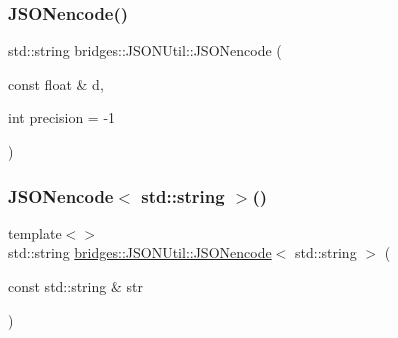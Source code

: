 \subsubsection{\texorpdfstring{J\+S\+O\+Nencode()}{JSONencode()}\hspace{0.1cm}{\footnotesize\ttfamily [4/4]}}
{\footnotesize\ttfamily std\+::string bridges\+::\+J\+S\+O\+N\+Util\+::\+J\+S\+O\+Nencode (\begin{DoxyParamCaption}\item[{const float \&}]{d,  }\item[{int}]{precision = {\ttfamily -\/1} }\end{DoxyParamCaption})\hspace{0.3cm}{\ttfamily [inline]}}

\mbox{\label{namespacebridges_1_1_j_s_o_n_util_a8db4f538e31bd8369e51a46802708f3d}} 
\subsubsection{\texorpdfstring{J\+S\+O\+Nencode$<$ std\+::string $>$()}{JSONencode< std::string >()}}
{\footnotesize\ttfamily template$<$$>$ \\
std\+::string \hyperlink{namespacebridges_1_1_j_s_o_n_util_a8510af8bef5b7bf4062d6f25eceb20b4}{bridges\+::\+J\+S\+O\+N\+Util\+::\+J\+S\+O\+Nencode}$<$ std\+::string $>$ (\begin{DoxyParamCaption}\item[{const std\+::string \&}]{str }\end{DoxyParamCaption})\hspace{0.3cm}{\ttfamily [inline]}}

